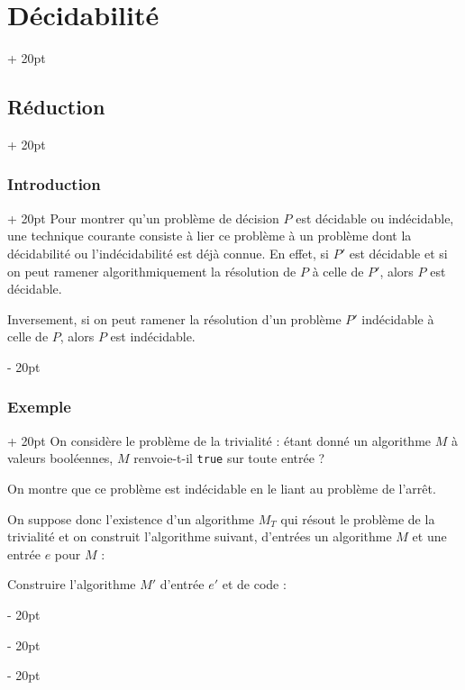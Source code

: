 \documentclass[a4paper, 12pt, twoside]{article}
\newcommand{\ind}[1][20pt]{\advance\leftskip + #1}
\newcommand{\deind}[1][20pt]{\advance\leftskip - #1}
\newenvironment{indt}[2][20pt]{#2 \par \ind[#1]}{\par \deind} %
\begin{document}
\begin{indt}{\section{Décidabilité}}
        \begin{indt}{\subsection{Réduction}}
            \begin{indt}{\subsubsection{Introduction}}
                Pour montrer qu'un problème de décision $P$ est décidable ou indécidable, une technique courante consiste à lier ce problème à un problème dont la décidabilité ou l'indécidabilité est déjà connue.
                En effet, si $P'$ est décidable et si on peut ramener algorithmiquement la résolution de $P$ à celle de $P'$, alors $P$ est décidable.

                Inversement, si on peut ramener la résolution d'un problème $P'$ indécidable à celle de $P$, alors $P$ est indécidable.
            \end{indt}

            \vspace{12pt}
            
            \begin{indt}{\subsubsection{Exemple}}
                On considère le problème de la trivialité : étant donné un algorithme $M$ à valeurs booléennes, $M$ renvoie-t-il \texttt{true} sur toute entrée ?

                On montre que ce problème est indécidable en le liant au problème de l'arrêt.

                On suppose donc l'existence d'un algorithme $M_T$ qui résout le problème de la trivialité et on construit l'algorithme suivant, d'entrées un algorithme $M$ et une entrée $e$ pour $M$ :

                \begin{algoBox}
                    \begin{algorithm}[H]
                    
                        \BlankLine

                        Construire l'algorithme $M'$ d'entrée $e'$ et de code :
                        \begin{algorithm}[H]


\end{algorithm}
\end{algorithm}
\end{algoBox}
\end{indt}
\end{indt}
\end{indt}
\end{document}
